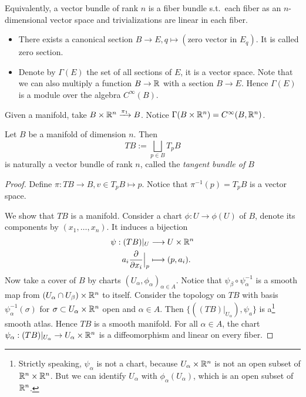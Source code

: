 \begin{remark}
 Equivalently, a  vector bundle of rank $n$ is a fiber bundle s.t.\ each fiber as an $n$-dimensional vector space and trivializations are linear in each fiber.
\end{remark}

\begin{remark}
    \begin{itemize}
        \item There exists a canonical section $B \to  E, q \mapsto (\text{zero vector in $E_q$})$. It is called zero section.
        \item Denote by $\Gamma(E)$ the set of all sections of $E$, it is a vector space.
            Note that we can also multiply a function $B \to  \mathbb{R}$ with a section $B \to  E$.
         Hence  $\Gamma(E)$ is a module over the algebra $C^{\infty}(B)$.
    \end{itemize}
\end{remark}
\begin{eg}
    Given a manifold, take $B \times \mathbb{R}^n \xrightarrow{\pi_1} B$.
    Notice $\Gamma(B \times \mathbb{R}^n) =
    C^{\infty}(B, \mathbb{R}^n)$.
\end{eg}
\begin{prop}
    Let $B$ be a manifold of dimension $n$.
    Then 
    \[
    TB := \bigsqcup_{p \in B} T_p B
    \] 
    is naturally a vector bundle of rank $n$, called the \emph{tangent bundle of $B$}
\end{prop}
\begin{proof}
    Define $\pi: TB \to  B, v \in T_p B \mapsto p$.
    Notice that $\pi^{-1}(p) = T_pB$ is a vector space.
    
  We show that $TB$ is a manifold.
    Consider a chart $\phi: U \to  \phi(U)$ of $B$, denote its components by $(x_1,\dots,x_n)$.
    It induces a   bijection
    \begin{align*}
        \psi: (TB)|_U &\longrightarrow U\times \mathbb{R}^n \\
        a_{i} \frac{\partial }{\partial x_i}\Big|_p
                      &\longmapsto (p, a_{i})
    .\end{align*}
    Now take a cover of $B$ by charts $(U_\alpha, \phi_\alpha)_{\alpha \in A}$.
    Notice that $\psi_\beta  \circ  \psi_\alpha^{-1}$ is a smooth map from $(U_\alpha\cap U_\beta)\times \mathbb{R}^n$ to itself.
    Consider the topology on $TB$ with basis  $\psi_\alpha^{-1}(\sigma)$ for $\sigma \subset U_\alpha \times \mathbb{R}^n$ open and $\alpha \in A$.
    Then $\{((TB)|_{U_\alpha}), \psi_a\} $ is a\footnote{Strictly speaking, $\psi_{\alpha}$ is not a chart, because $U_\alpha \times \mathbb{R}^n$ is not an open subset of $\mathbb{R}^n\times \mathbb{R}^n$. But we can identify  $U_\alpha$ with $\phi_{\alpha}(U_\alpha)$, which is an open subset of $\mathbb{R}^n$.}    
     smooth atlas.
    Hence $TB$ is a smooth manifold.
    For all $\alpha \in A$, the chart $\psi_\alpha: (TB)|_{U_\alpha} \to  U_\alpha \times \mathbb{R}^n$ is a diffeomorphism and linear on every fiber.
\end{proof}
 

